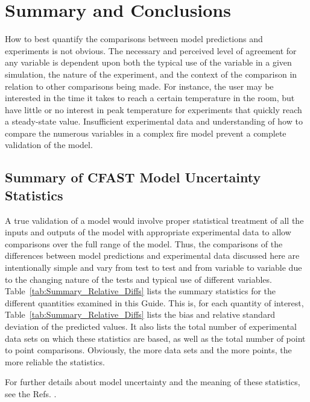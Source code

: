 \chapter{Summary and Conclusions}

How to best quantify the comparisons between model predictions and experiments is not obvious. The necessary and perceived level of agreement for any variable is dependent upon both the typical use of the variable in a given simulation, the nature of the experiment, and the context of the comparison in relation to other comparisons being made. For instance, the user may be interested in the time it takes to reach a certain temperature in the room, but have little or no interest in peak temperature for experiments that quickly reach a steady-state value. Insufficient experimental data and understanding of how to compare the numerous variables in a complex fire model prevent a complete validation of the model.

\section{Summary of CFAST Model Uncertainty Statistics}

A true validation of a model would involve proper statistical treatment of all the inputs and outputs of the model with appropriate experimental data to allow comparisons over the full range of the model. Thus, the comparisons of the differences between model predictions and experimental data discussed here are intentionally simple and vary from test to test and from variable to variable due to the changing nature of the tests and typical use of different variables. Table~\ref{tab:Summary_Relative_Diffs} lists the summary statistics for the different quantities examined in this Guide. This is, for each quantity of interest, Table~\ref{tab:Summary_Relative_Diffs} lists the bias and relative standard deviation of the predicted values. It also lists the total number of experimental data sets on which these statistics are based, as well as the total number of point to point comparisons. Obviously, the more data sets and the more points, the more reliable the statistics.

For further details about model uncertainty and the meaning of these statistics, see the Refs. \cite{FDS_Validation_Guide_6, NRCNUREG1824}.

\begin{table}

\label{tab:Summary_Relative_Diffs}
\vspace{0.1in}


\end{table}

